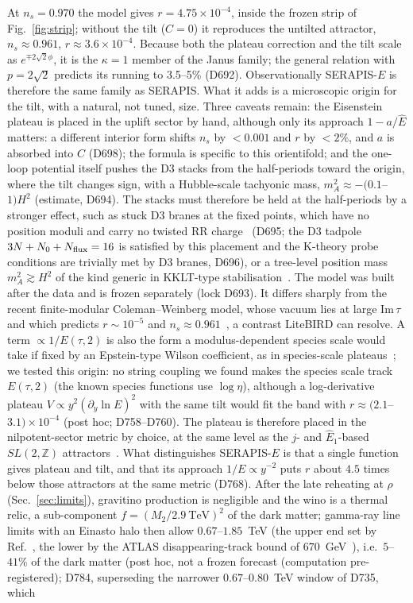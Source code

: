 \documentclass[aps,prd,twocolumn,superscriptaddress,nofootinbib,floatfix]{revtex4-2}
\begin{document}
At $n_s=0.970$ the model gives $r=4.75\times10^{-4}$, inside the frozen strip of Fig.~\ref{fig:strip}; without the tilt ($C=0$) it reproduces the untilted attractor, $n_s\approx0.961$, $r\approx3.6\times10^{-4}$. Because both the plateau correction and the tilt scale as $e^{\mp2\sqrt2\phi}$, it is the $\kappa=1$ member of the Janus family; the general relation with $p=2\sqrt2$ predicts its running to 3.5--5\% (D692). Observationally SERAPIS-$E$ is therefore the same family as SERAPIS. What it adds is a microscopic origin for the tilt, with a natural, not tuned, size. Three caveats remain: the Eisenstein plateau is placed in the uplift sector by hand, although only its approach $1-a/\hat E$ matters: a different interior form shifts $n_s$ by $<0.001$ and $r$ by $<2\%$, and $a$ is absorbed into $C$ (D698); the formula is specific to this orientifold; and the one-loop potential itself pushes the D3 stacks from the half-periods toward the origin, where the tilt changes sign, with a Hubble-scale tachyonic mass, $m_A^2\approx-(0.1$--$1)H^2$ (estimate, D694). The stacks must therefore be held at the half-periods by a stronger effect, such as stuck D3 branes at the fixed points, which have no position moduli and carry no twisted RR charge~\cite{MaidenShiuStefanski2006} (D695; the D3 tadpole $3N+N_0+N_{\rm flux}=16$ is satisfied by this placement and the K-theory probe conditions are trivially met by D3 branes, D696), or a tree-level position mass $m_A^2\gtrsim H^2$ of the kind generic in KKLT-type stabilisation~\cite{BHK2004}. The model was built after the data and is frozen separately (lock D693). It differs sharply from the recent finite-modular Coleman--Weinberg model, whose vacuum lies at large $\mathrm{Im}\,\tau$ and which predicts $r\sim10^{-5}$ and $n_s\approx0.961$~\cite{arXiv_2607_00528}, a contrast LiteBIRD can resolve. A term $\propto1/E(\tau,2)$ is also the form a modulus-dependent species scale would take if fixed by an Epstein-type Wilson coefficient, as in species-scale plateaus~\cite{arXiv_2407_12081,arXiv_2510_23715}; we tested this origin: no string coupling we found makes the species scale track $E(\tau,2)$ (the known species functions use $\log\eta$), although a log-derivative plateau $V\propto y^2(\partial_y\ln E)^2$ with the same tilt would fit the band with $r\approx(2.1$--$3.1)\times10^{-4}$ (post hoc; D758--D760). The plateau is therefore placed in the nilpotent-sector metric by choice, at the same level as the $j$- and $\hat E_1$-based $SL(2,\mathbb{Z})$ attractors~\cite{arXiv_2408_05203}. What distinguishes SERAPIS-$E$ is that a single function gives plateau and tilt, and that its approach $1/E\propto y^{-2}$ puts $r$ about $4.5$ times below those attractors at the same metric (D768). After the late reheating at $\rho$ (Sec.~\ref{sec:limits}), gravitino production is negligible and the wino is a thermal relic, a sub-component $f=(M_2/2.9~\mathrm{TeV})^2$ of the dark matter; gamma-ray line limits with an Einasto halo then allow $0.67$--$1.85$~TeV (the upper end set by Ref.~\cite{arXiv_2507_15934}, the lower by the ATLAS disappearing-track bound of $670$~GeV~\cite{arXiv_2603_08315}), i.e.\ $5$--$41\%$ of the dark matter (post hoc, not a frozen forecast (computation pre-registered); D784, superseding the narrower $0.67$--$0.80$~TeV window of D735, which 
\end{document}

